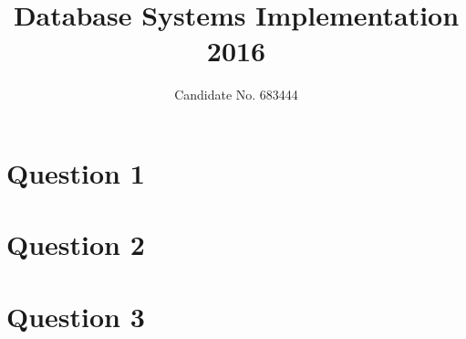 \documentclass{tufte-handout}
\title{Database Systems Implementation 2016}
\author{Candidate No. 683444}
\theoremstyle{definition}
\numberwithin{definition}{section}
\theoremstyle{plain}
\numberwithin{prop}{section}
\theoremstyle{plain}
\numberwithin{lemma}{section}
\theoremstyle{plain}
\numberwithin{corollary}{section}
\begin{document}
\maketitle

\section{Question 1}\label{sec:q-1}


\newcommand{\sectionbreak}{\clearpage}

\section{Question 2}\label{sec:q-2}


\section{Question 3}\label{sec:q-3}

\end{document}
